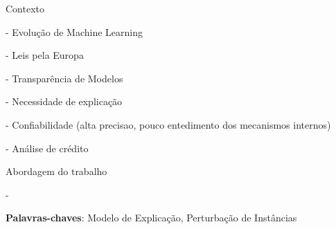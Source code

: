 
\setlength{\absparsep}{18pt} %
\begin{resumo}

Contexto

- Evolução de Machine Learning

- Leis pela Europa

- Transparência de Modelos

- Necessidade de explicação

- Confiabilidade (alta precisao, pouco entedimento dos mecanismos internos)

- Análise de crédito


Abordagem do trabalho

- 

\vspace{\onelineskip}

\textbf{Palavras-chaves}: Modelo de Explicação, Perturbação de Instâncias

\end{resumo}